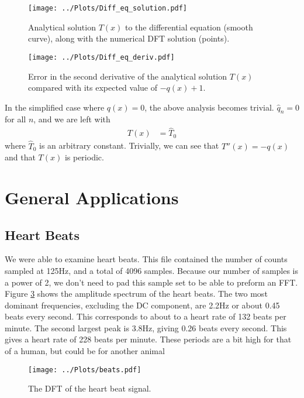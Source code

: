 \documentclass[twocolumn]{myarticle}
\begin{document}
\begin{figure}[ht]
    \centering
    \texttt{[image: ../Plots/Diff\_eq\_solution.pdf]}
    \caption{Analytical solution $ T(x) $ to the differential equation (smooth curve), along with the numerical DFT solution (points).}
    \label{fig:diff_eq_solution}
\end{figure}

\begin{figure}[ht]
    \centering
    \texttt{[image: ../Plots/Diff\_eq\_deriv.pdf]}
    \caption{Error in the second derivative of the analytical solution $ T(x) $ compared with its expected value of $ -q(x) + 1 $.}
    \label{fig:diff_eq_deriv}
\end{figure}

In the simplified case where $ q(x) = 0 $, the above analysis becomes trivial.
$ \hat{q}_n = 0 $ for all $ n $, and we are left with
\begin{align}
    T(x) &= \hat{T}_0
\end{align}
where $ \hat{T}_0 $ is an arbitrary constant.
Trivially, we can see that $ T''(x) = -q(x) $ and that $ T(x) $ is periodic.

\section{General Applications}
\subsection{Heart Beats}

We were able to examine heart beats. 
This file contained the number of counts sampled at 125Hz, and a total of 4096 samples. 
Because our number of samples is a power of 2, we don't need to pad this sample set to be able to preform an FFT. 
Figure \ref{fig:heart_beat} shows the amplitude spectrum of the heart beats. 
The two most dominant frequencies, excluding the DC component, are 2.2Hz or about 0.45 beats every second. 
This corresponds to about to a heart rate of 132 beats per minute. 
The second largest peak is 3.8Hz, giving 0.26 beats every second. 
This gives a heart rate of 228 beats per minute. 
These periods are a bit high for that of a human, but could be for another animal
\begin{figure}[ht]
    \centering
    \texttt{[image: ../Plots/beats.pdf]}
    \caption{The DFT of the heart beat signal.}
    \label{fig:heart_beat}
\end{figure}
\end{document}
